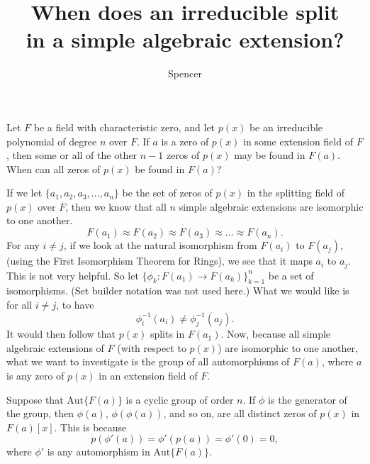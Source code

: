 \documentclass{article}
\title{When does an irreducible split\\in a simple algebraic extension?}
\author{Spencer}
\begin{document}
\maketitle

\newcommand{\Aut}{\mbox{Aut}}

Let $F$ be a field with characteristic zero, and let $p(x)$ be an irreducible
polynomial of degree $n$ over $F$.  If $a$ is a zero of $p(x)$ in some extension field
of $F$, then some or all of the other $n-1$ zeros of $p(x)$ may be found in $F(a)$.
When can all zeros of $p(x)$ be found in $F(a)$?

If we let $\{a_1,a_2,a_3,\dots,a_n\}$ be the set of zeros of $p(x)$ in the
splitting field of $p(x)$ over $F$, then we know that all $n$ simple algebraic
extensions are isomorphic to one another.
\begin{equation*}
F(a_1)\approx F(a_2)\approx F(a_3)\approx\dots\approx F(a_n).
\end{equation*}
For any $i\neq j$, if we look at the natural isomorphism from
$F(a_i)$ to $F(a_j)$, (using the First Isomorphism Theorem for Rings),
we see that it maps $a_i$ to $a_j$.  This is not very helpful.
So let $\{\phi_k:F(a_1)\to F(a_k)\}_{k=1}^n$ be a set of isomorphisms.
(Set builder notation was not used here.)
What we would like is for all $i\neq j$, to have
\begin{equation*}
\phi^{-1}_i(a_i)\neq \phi^{-1}_j(a_j).
\end{equation*}
It would then follow that $p(x)$ splits in $F(a_1)$.  Now, because
all simple algebraic extensions of $F$ (with respect to $p(x)$) are
isomorphic to one another, what we want to investigate is the
group of all automorphisms of $F(a)$, where $a$ is any zero of $p(x)$ in
an extension field of $F$.

Suppose that $\Aut\{F(a)\}$ is a cyclic group of order $n$.  If $\phi$
is the generator of the group, then $\phi(a)$, $\phi(\phi(a))$, and
so on, are all distinct zeros of $p(x)$ in $F(a)[x]$.  This is because
\begin{equation*}
p(\phi'(a))=\phi'(p(a))=\phi'(0)=0,
\end{equation*}
where $\phi'$ is any automorphism in $\Aut\{F(a)\}$.
\end{document}
